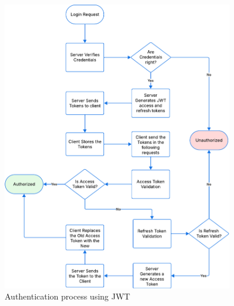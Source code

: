 \begin{figure}[htbp]
	\centering
	\includegraphics[width=0.9\textwidth, height=0.6\textheight, keepaspectratio]{Chapters/Figures/Security/JWT.pdf}
	\caption{Authentication process using JWT}
	\label{fig:security:JWT}
\end{figure}

